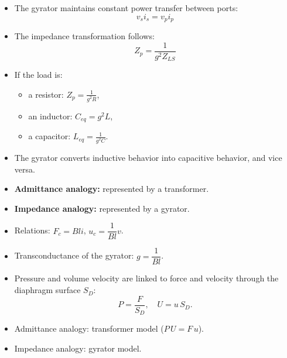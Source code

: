 \begin{tcolorbox}[colback=gray!10!white,colframe=black,title=\textbf{Summary – Gyrator Behavior}]
\begin{itemize}
    \item The gyrator maintains constant power transfer between ports:
    \[
    v_s i_s = v_p i_p
    \]
    \item The impedance transformation follows:
    \[
    Z_p = \frac{1}{g^2 Z_{LS}}
    \]
    \item If the load is:
    \begin{itemize}
        \item a resistor: \( Z_p = \frac{1}{g^2 R} \),
        \item an inductor: \( C_{eq} = g^2 L \),
        \item a capacitor: \( L_{eq} = \frac{1}{g^2 C} \).
    \end{itemize}
    \item The gyrator converts inductive behavior into capacitive behavior, and vice versa.
\end{itemize}
\end{tcolorbox}



\begin{tcolorbox}[colback=gray!10!white,colframe=black,title=\textbf{Summary – Electrical to Mechanical Transduction}]
\begin{itemize}
    \item \textbf{Admittance analogy:} represented by a transformer.
    \item \textbf{Impedance analogy:} represented by a gyrator.
    \item Relations: \( F_c = B l i \), \quad \( u_c = \dfrac{1}{B l} v \).
    \item Transconductance of the gyrator: \( g = \dfrac{1}{B l} \).
\end{itemize}
\end{tcolorbox}

\begin{tcolorbox}[colback=gray!10!white,colframe=black,title=\textbf{Summary – Mechanical to Acoustical Transduction}]
\begin{itemize}
    \item Pressure and volume velocity are linked to force and velocity through the diaphragm surface \( S_D \):
    \[
    P = \frac{F}{S_D}, \quad U = u \, S_D.
    \]
    \item Admittance analogy: transformer model (\( P \, U = F \, u \)).
    \item Impedance analogy: gyrator model.
\end{itemize}
\end{tcolorbox}

